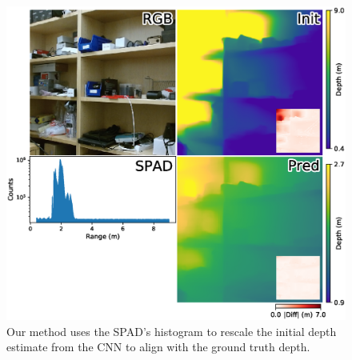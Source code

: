 
\begin{figure}
  \includegraphics[width=\linewidth]{sections/figures/captured/midas/8_30_small_lab_scene/teaser.eps}
  \caption{Our method uses the SPAD's histogram to rescale the initial depth
    estimate from the CNN to align with the ground truth depth.}
  \label{fig:teaser}
\end{figure}

